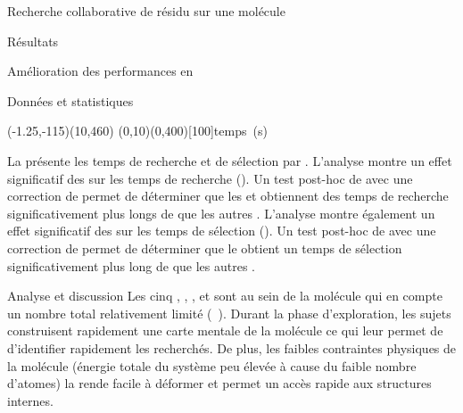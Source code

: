 \documentclass[myfrancais,ngerman,english,french]{mythesis}
\begin{document}
\begin{mychapter}{Recherche collaborative de résidu sur une molécule}
\begin{mysection}{Résultats}
\begin{mysubsection}{Amélioration des performances en }
\begin{mysubsubsection}{Données et statistiques}
					\begin{myfigure}
						\begin{myps}(-1.25,-115)(10,460)
							\myaxes(0,10){}(0,400)[100]{temps~(s)}
						\end{myps}
					\end{myfigure}

					La  présente les temps de recherche et de sélection par  .
					L'analyse montre un effet significatif des   sur les temps de recherche ().
					Un test post-hoc de  avec une correction de  permet de déterminer que les   et  obtiennent des temps de recherche significativement plus longs de  que les autres .
					L'analyse montre également un effet significatif des   sur les temps de sélection ().
					Un test post-hoc de  avec une correction de  permet de déterminer que le   obtient un temps de sélection significativement plus long de  que les autres .
				\end{mysubsubsection}
				\begin{mysubsubsection}{Analyse et discussion}
					Les cinq  , , ,  et  sont au sein de la molécule \myTRPCAGE qui en compte un nombre total relativement limité (~).
					Durant la phase d'exploration, les sujets construisent rapidement une carte mentale de la molécule ce qui leur permet de d'identifier rapidement les  recherchés.
					De plus, les faibles contraintes physiques de la molécule (énergie totale du système peu élevée à cause du faible nombre d'atomes) la rende facile à déformer et permet un accès rapide aux structures internes.

\end{mysubsubsection}
\end{mysubsection}
\end{mysection}
\end{mychapter}
\end{document}
